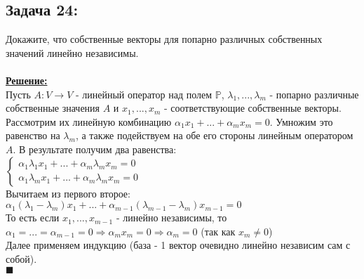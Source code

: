 \documentclass[a4paper,12pt,titlepage,final]{article}
\begin{document}
\subsection*{Задача 24:}
\noindent Докажите, что собственные векторы для попарно различных собственных значений линейно независимы. \\ \\
\textbf{\underline{Решение:}} \\
Пусть $A: V \rightarrow V$ - линейный оператор над полем $\mathbb{P}$, $\lambda_1, ... , \lambda_m$ - попарно различные собственные значения $A$ 
и $x_1, ... , x_m$ - соответствующие собственные векторы. \\
Рассмотрим их линейную комбинацию $\alpha_1 x_1 + ... + \alpha_m x_m = 0$. Умножим это равенство на $\lambda_m$, 
а также подействуем на обе его стороны линейным оператором $A$. В результате получим два равенства: \\
$
\begin{cases}
    \alpha_1 \lambda_1 x_1 + ... + \alpha_m \lambda_m x_m = 0 \\
    \alpha_1 \lambda_m x_1 + ... + \alpha_m \lambda_m x_m = 0
\end{cases}
$ \\
Вычитаем из первого второе:
$\alpha_1 (\lambda_1 - \lambda_m)x_1 + ... + \alpha_{m - 1} (\lambda_{m - 1} - \lambda_m)x_{m - 1} = 0$ \\
То есть если $x_1, ... , x_{m - 1}$ - линейно независимы, то $\alpha_1 = ... = \alpha_{m - 1} = 0 \Rightarrow
\alpha_m x_m = 0 \Rightarrow \alpha_m = 0$ (так как $x_m \neq 0$) \\
Далее применяем индукцию (база - 1 вектор очевидно линейно независим сам с собой). \\ $\blacksquare$ \\ \\ \\


\end{document}
